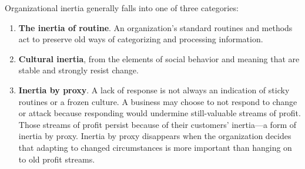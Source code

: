 \documentclass{article}
\newenvironment{nosepenumerate}
{ \begin{enumerate}
    \setlength{\itemsep}{0pt}
    \setlength{\parskip}{0pt}
    \setlength{\parsep}{0pt}     }
{ \end{enumerate}                  }
\begin{document}
\begin{multicols}{2}
Organizational inertia generally falls into one of three categories:

\begin{nosepenumerate}
    \item \textbf{The inertia of routine}. An organization’s standard routines and methods act to preserve old ways of categorizing and processing information.
    \item \textbf{Cultural inertia}, from the elements of social behavior and meaning that are stable and strongly resist change.
    \item \textbf{Inertia by proxy}. A lack of response is not always an indication of sticky routines or a frozen culture. A business may choose to not respond to change or attack because responding would undermine still-valuable streams of profit. Those streams of profit persist because of their customers’ inertia—a form of inertia by proxy. Inertia by proxy disappears when the organization decides that adapting to changed circumstances is more important than hanging on to old profit streams.
\end{nosepenumerate}

\end{multicols}
\end{document}

